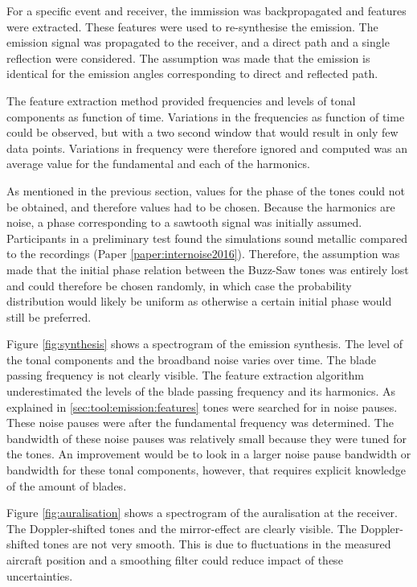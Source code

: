 For a specific event and receiver, the immission was backpropagated and features
were extracted. These features were used to re-synthesise the emission. The
emission signal was propagated to the receiver, and a direct path and a single
reflection were considered. The assumption was made that the emission is
identical for the emission angles corresponding to direct and reflected path.

The feature extraction method provided frequencies and levels of tonal
components as function of time. Variations in the frequencies as function of
time could be observed, but with a two second window that would result in only
few data points. Variations in frequency were therefore ignored and computed was an
average value for the fundamental and each of the harmonics.

As mentioned in the previous section, values for the phase of the tones could
not be obtained, and therefore values had to be chosen. Because the harmonics
are  noise, a phase corresponding to a sawtooth signal was
initially assumed. Participants in a preliminary test found the simulations
sound metallic compared to the recordings (Paper \ref{paper:internoise2016}).
Therefore, the assumption was made that the initial phase relation between the
Buzz-Saw tones was entirely lost and could therefore be chosen randomly, in
which case the probability distribution would likely be uniform as otherwise a
certain initial phase would still be preferred.

Figure \ref{fig:synthesis} shows a spectrogram of the emission synthesis. The
level of the tonal components and the broadband noise varies over time. The
blade passing frequency is not clearly visible. The feature extraction algorithm
underestimated the levels of the blade passing frequency and its harmonics. As
explained in \ref{sec:tool:emission:features} tones were searched for in noise
pauses. These noise pauses were  after the fundamental frequency
was determined. The bandwidth of these noise pauses was relatively small because
they were tuned for the  tones. An improvement would be to look in
a larger noise pause bandwidth or bandwidth for these tonal components, however,
that requires explicit knowledge of the amount of blades.

Figure \ref{fig:auralisation} shows a spectrogram
of the auralisation at the receiver. The Doppler-shifted tones and the
mirror-effect are clearly visible. The Doppler-shifted tones are not very
smooth. This is due to fluctuations in the measured aircraft position and a smoothing filter
could reduce impact of these uncertainties.


